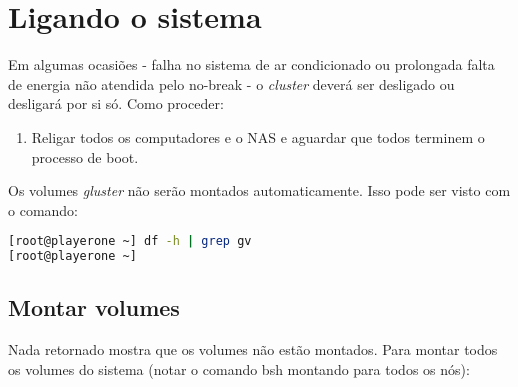\chapter{Ligando o sistema}
\label{chap:turn-on}

Em algumas ocasiões - falha no sistema de ar condicionado ou prolongada falta de energia não atendida pelo no-break - o \textit{cluster} deverá ser desligado ou desligará por si só. Como proceder:

\begin{enumerate}
    \item Religar todos os computadores e o NAS e aguardar que todos terminem o processo de boot. 
\end{enumerate}

Os volumes \textit{gluster} não serão montados automaticamente. Isso pode ser visto com o comando:

\begin{lstlisting}[language=bash,basicstyle=\small]
[root@playerone ~] df -h | grep gv
[root@playerone ~] 
\end{lstlisting}

\section{Montar volumes}
Nada retornado mostra que os volumes não estão montados. Para montar todos os volumes do sistema (notar o comando bsh montando para todos os nós):

